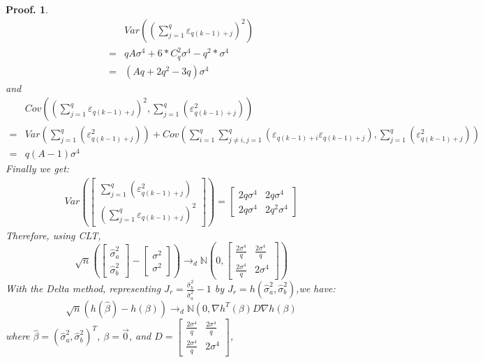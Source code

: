 \documentclass{article}
\theoremstyle{break}
\newtheorem*{proof_break}{Proof.}
\begin{document}
\begin{proof_break}
        \begin{align*}
            &Var((\sum_{j=1}^{q}\varepsilon_{q(k-1)+j})^2)\\
            =&qA\sigma^4+6*C_q^2\sigma^4-q^2*\sigma^4\\
            =&(Aq+2q^2-3q)\sigma^4
        \end{align*}
        and
        \begin{align*}
            &Cov((\sum_{j=1}^{q}\varepsilon_{q(k-1)+j})^2,\sum_{j=1}^{q}(\varepsilon_{q(k-1)+j}^2))\\
            =&Var(\sum_{j=1}^{q}(\varepsilon_{q(k-1)+j}^2))+Cov(\sum_{i=1}^{q}\sum_{j\neq{i},j=1}^{q}(\varepsilon_{q(k-1)+i}\varepsilon_{q(k-1)+j}),\sum_{j=1}^{q}(\varepsilon_{q(k-1)+j}^2))\\
            =&q(A-1)\sigma^4
        \end{align*}
        Finally we get:
        \begin{align*}
        Var\left(\left[\begin{array}{c}{\sum_{j=1}^{q}(\varepsilon_{q(k-1)+j}^2)} \\ {(\sum_{j=1}^{q}\varepsilon_{q(k-1)+j})^2}\end{array}\right]\right)=\left[\begin{array}{cc}{2q\sigma^4} & {2q\sigma^4}\\ {2q\sigma^{4}} & {2q^2\sigma^{4}}\end{array}\right]
        \end{align*}
        Therefore, using CLT,
            $$\sqrt{n}\left(\left[\begin{array}{c}{\hat{\sigma}_{a}^{2}} \\ {\hat{\sigma}_{b}^{2}}\end{array}\right]-\left[\begin{array}{c}{\sigma^{2}} \\ {\sigma^{2}}\end{array}\right]\right) \rightarrow_{d} \mathbb{N}\left(0,\left[\begin{array}{cc}{\frac{2\sigma^{4}}{q}} & {\frac{2\sigma^4}{q}} \\ {\frac{2\sigma^{4}}{q}} & {2\sigma^4}\end{array}\right]\right)$$
        With the Delta method, representing $J_r=\frac{\hat{\sigma}_b^2}{\hat{\sigma}_a^2}-1$ by $J_{r}=h(\hat{\sigma}_{a}^{2}, \hat{\sigma}_{b}^{2})$,we have: 
        $$\sqrt{n}(h(\hat{\beta})-h(\beta)) \rightarrow_{d} \mathbb{N}\left(0, \nabla h^{T}(\beta) D \nabla h(\beta)\right.$$
        where $\hat{\beta}=(\hat{\sigma}_{a}^{2}, \hat{\sigma}_{b}^{2})^{T}$, $\beta=\vec{0}$, and $D=\left[\begin{array}{cc}{\frac{2\sigma^{4}}{q}} & {\frac{2\sigma^4}{q}} \\ {\frac{2\sigma^{4}}{q}} & {2\sigma^4}\end{array}\right]$,

\end{proof_break}
\end{document}
